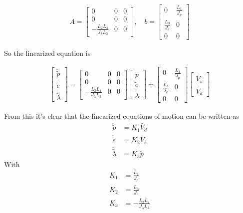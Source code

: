 \begin{align*}
A =
\begin{bmatrix}
             0                      & 0          & 0\\
             0                      & 0          & 0\\
    -\frac{L_2L_4}{J_\lambda L_3}   & 0          & 0
\end{bmatrix},\quad
b = 
\begin{bmatrix} 
          0           &       \frac{L_1}{J_p}\\
    \frac{L_3}{J_e}   &             0\\
          0           &             0 
\end{bmatrix}
\end{align*}

So the linearized equation is

\begin{align*}
\begin{bmatrix}
    \ddot{\tilde{p}}\\
    \ddot{\tilde{e}}\\
    \ddot{\tilde{\lambda}}
\end{bmatrix} = 
\begin{bmatrix}
                0                   &   0       &           0\\
                0                   &   0       &           0\\
    -\frac{L_2L_4}{J_\lambda L_3}   &   0       &           0
\end{bmatrix}
\begin{bmatrix}
    \tilde{p}\\
    \tilde{e}\\
    \tilde{\lambda}
\end{bmatrix} +
\begin{bmatrix}
            0          &       \frac{L_1}{J_p}\\
    \frac{L_3}{J_e}    &              0       \\ 
            0          &              0
\end{bmatrix}   
\begin{bmatrix}
\tilde{V_s}\\
\tilde{V_d}
\end{bmatrix}
\end{align*}

From this it's clear that the linearized equations of motion can be written as
\begin{align*}
    \ddot{\tilde{p}} &= K_1 \tilde{V_d}\\
    \ddot{\tilde{e}} &= K_2 \tilde{V_s}\\
    \ddot{\tilde{\lambda}} &= K_3 \tilde{p}
\end{align*}
With
\begin{align*}
    K_1 &= \frac{L_1}{J_p}\\
    K_2 &= \frac{L_3}{J_e}\\
    K_3 &= -\frac{L_2L_4}{J_\lambda L_3}
\end{align*}

